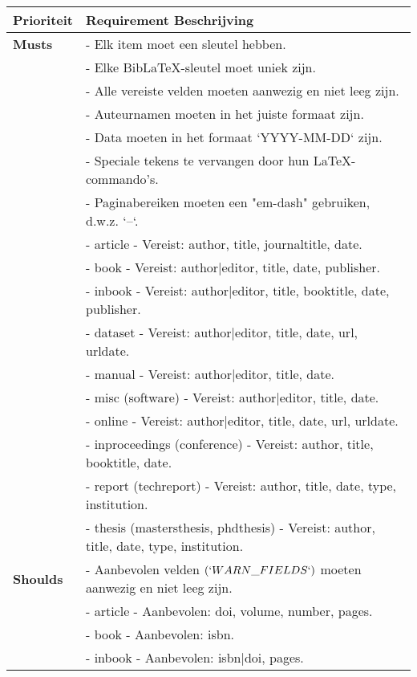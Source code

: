 \begin{table}[ht]
    \centering
    \begin{tabular}{p{2.5cm} p{13cm}}
        \toprule
        \textbf{Prioriteit} & \textbf{Requirement Beschrijving} \\
        \midrule
        \textbf{Musts} & 
          - Elk item moet een sleutel hebben. \\
        & - Elke BibLaTeX-sleutel moet uniek zijn. \\
        & - Alle vereiste velden moeten aanwezig en niet leeg zijn. \\
        & - Auteurnamen moeten in het juiste formaat zijn. \\
        & - Data moeten in het formaat `YYYY-MM-DD` zijn. \\
        & - Speciale tekens te vervangen door hun LaTeX-commando's. \\
        & - Paginabereiken moeten een "em-dash" gebruiken, d.w.z. `--`. \\
        & - article - Vereist: author, title, journaltitle, date. \\
        & - book - Vereist: author|editor, title, date, publisher. \\
        & - inbook - Vereist: author|editor, title, booktitle, date, publisher. \\
        & - dataset - Vereist: author|editor, title, date, url, urldate. \\
        & - manual - Vereist: author|editor, title, date. \\
        & - misc (software) - Vereist: author|editor, title, date. \\
        & - online - Vereist: author|editor, title, date, url, urldate. \\
        & - inproceedings (conference) - Vereist: author, title, booktitle, date. \\
        & - report (techreport) - Vereist: author, title, date, type, institution. \\
        & - thesis (mastersthesis, phdthesis) - Vereist: author, title, date, type, institution. \\
        \midrule
        \textbf{Shoulds} 
        & - Aanbevolen velden \texttt{$(`WARN\_FIELDS`)$} moeten aanwezig en niet leeg zijn. \\
        & - article - Aanbevolen: doi, volume, number, pages. \\
        & - book - Aanbevolen: isbn. \\
        & - inbook - Aanbevolen: isbn|doi, pages. \\

\end{tabular}
\end{table}
